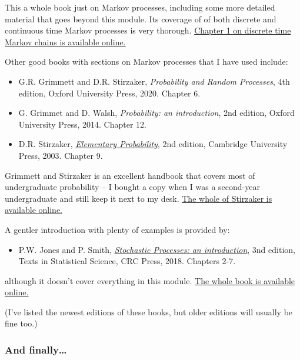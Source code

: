 \documentclass[
  a4paper,
]{article}
\providecommand{\tightlist}{%
  \setlength{\itemsep}{0pt}\setlength{\parskip}{0pt}}
\theoremstyle{definition}
\theoremstyle{definition}
\theoremstyle{definition}
\theoremstyle{remark}
\begin{document}
This a whole book just on Markov processes, including some more detailed material that goes beyond this module. Its coverage of of both discrete and continuous time Markov processes is very thorough. \href{http://www.statslab.cam.ac.uk/~james/Markov/}{Chapter 1 on discrete time Markov chains is available online.}

Other good books with sections on Markov processes that I have used include:

\begin{itemize}
\tightlist
\item
  G.R. Grimmett and D.R. Stirzaker, \emph{Probability and Random Processes}, 4th edition, Oxford University Press, 2020. Chapter 6.
\item
  G. Grimmet and D. Walsh, \emph{Probability: an introduction}, 2nd edition, Oxford University Press, 2014. Chapter 12.
\item
  D.R. Stirzaker, \href{https://leeds.primo.exlibrisgroup.com/permalink/44LEE_INST/13rlbcs/alma991013131349705181}{\emph{Elementary Probability}}, 2nd edition, Cambridge University Press, 2003. Chapter 9.
\end{itemize}

Grimmett and Stirzaker is an excellent handbook that covers most of undergraduate probability -- I bought a copy when I was a second-year undergraduate and still keep it next to my desk.
\href{https://leeds.primo.exlibrisgroup.com/permalink/44LEE_INST/13rlbcs/alma991013131349705181}{The whole of Stirzaker is available online.}

A gentler introduction with plenty of examples is provided by:

\begin{itemize}
\tightlist
\item
  P.W. Jones and P. Smith, \href{https://leeds.primo.exlibrisgroup.com/permalink/44LEE_INST/13rlbcs/alma991002938739705181}{\emph{Stochastic Processes: an introduction}}, 3nd edition, Texts in Statistical Science, CRC Press, 2018. Chapters 2-7.
\end{itemize}

although it doesn't cover everything in this module. \href{https://leeds.primo.exlibrisgroup.com/permalink/44LEE_INST/13rlbcs/alma991002938739705181}{The whole book is available online.}

(I've listed the newest editions of these books, but older editions will usually be fine too.)

\hypertarget{finally}{%
\subsubsection*{And finally\ldots{}}\label{finally}}
\end{document}
